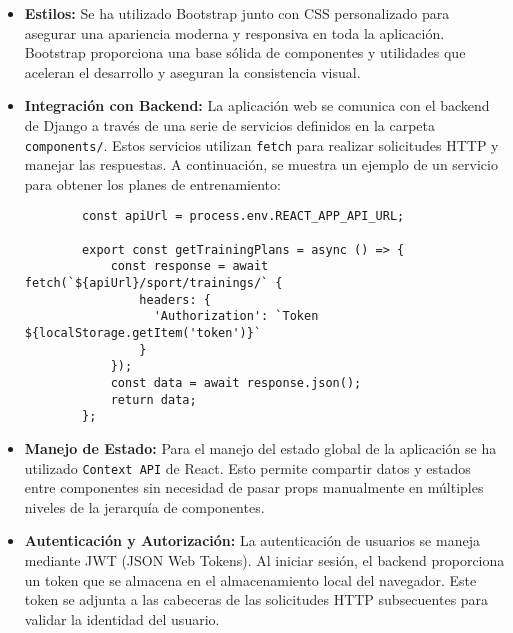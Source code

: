 \begin{itemize}
    \item \textbf{Estilos:} Se ha utilizado Bootstrap junto con CSS personalizado para asegurar una apariencia moderna y responsiva en toda la aplicación. Bootstrap proporciona una base sólida de componentes y utilidades que aceleran el desarrollo y aseguran la consistencia visual.

    \item \textbf{Integración con Backend:} La aplicación web se comunica con el backend de Django a través de una serie de servicios definidos en la carpeta \texttt{components/}. Estos servicios utilizan \texttt{fetch} para realizar solicitudes HTTP y manejar las respuestas. A continuación, se muestra un ejemplo de un servicio para obtener los planes de entrenamiento:
    \begin{verbatim}
        const apiUrl = process.env.REACT_APP_API_URL;

        export const getTrainingPlans = async () => {
            const response = await fetch(`${apiUrl}/sport/trainings/` {
                headers: {
                  'Authorization': `Token ${localStorage.getItem('token')}`
                }
            });
            const data = await response.json();
            return data;
        };
    \end{verbatim}

    \item \textbf{Manejo de Estado:} Para el manejo del estado global de la aplicación se ha utilizado \texttt{Context API} de React. Esto permite compartir datos y estados entre componentes sin necesidad de pasar props manualmente en múltiples niveles de la jerarquía de componentes.

    \item \textbf{Autenticación y Autorización:} La autenticación de usuarios se maneja mediante JWT (JSON Web Tokens). Al iniciar sesión, el backend proporciona un token que se almacena en el almacenamiento local del navegador. Este token se adjunta a las cabeceras de las solicitudes HTTP subsecuentes para validar la identidad del usuario.

\end{itemize}